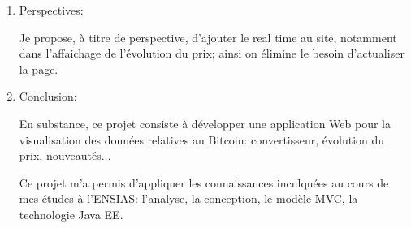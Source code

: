 \documentclass[12pt]{article}
\begin{document}
\begin{enumerate}
\vspace{\baselineskip}
	\item Perspectives:\par

Je propose, à titre de perspective, d’ajouter le real time au site, notamment dans l’affaichage de l’évolution du prix; ainsi on élimine le besoin d’actualiser la page.\par

	\item Conclusion:\par


\vspace{\baselineskip}
En substance, ce projet consiste à développer une application Web pour la visualisation des données relatives au Bitcoin: convertisseur, évolution du prix, nouveautés$ \ldots $ \par

Ce projet m’a permis d’appliquer les connaissances inculquées au cours de mes études à l’ENSIAS: l’analyse, la conception, le modèle MVC, la technologie Java EE.\par


\vspace{\baselineskip}

\vspace{\baselineskip}

\vspace{\baselineskip}

\vspace{\baselineskip}

\vspace{\baselineskip}

\vspace{\baselineskip}

\vspace{\baselineskip}

\vspace{\baselineskip}

\vspace{\baselineskip}

\vspace{\baselineskip}

\vspace{\baselineskip}

\vspace{\baselineskip}

\vspace{\baselineskip}

\vspace{\baselineskip}


\end{enumerate}
\end{document}

